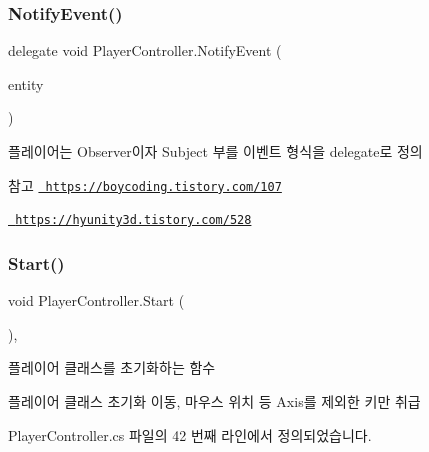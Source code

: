 \subsubsection{\texorpdfstring{NotifyEvent()}{NotifyEvent()}}
{\footnotesize\ttfamily delegate void Player\+Controller.\+Notify\+Event (\begin{DoxyParamCaption}\item[{Game\+Object}]{entity }\end{DoxyParamCaption})}



플레이어는 Observer이자 Subject 부를 이벤트 형식을 delegate로 정의 

\begin{DoxySeeAlso}{참고}
\href{https://boycoding.tistory.com/107}{\texttt{ https\+://boycoding.\+tistory.\+com/107}} 

\href{https://hyunity3d.tistory.com/528}{\texttt{ https\+://hyunity3d.\+tistory.\+com/528}} 
\end{DoxySeeAlso}
\mbox{\label{class_player_controller_ae1117d9c4da3193181cddad2c814e467}} 
\subsubsection{\texorpdfstring{Start()}{Start()}}
{\footnotesize\ttfamily void Player\+Controller.\+Start (\begin{DoxyParamCaption}{ }\end{DoxyParamCaption})\hspace{0.3cm}{\ttfamily [inline]}, {\ttfamily [private]}}



플레이어 클래스를 초기화하는 함수 

플레이어 클래스 초기화 이동, 마우스 위치 등 Axis를 제외한 키만 취급 

Player\+Controller.\+cs 파일의 42 번째 라인에서 정의되었습니다.


